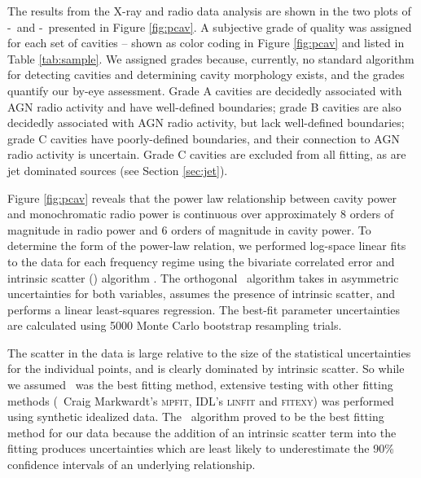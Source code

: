 \documentclass{emulateapj}
\begin{document}
The results from the X-ray and radio data analysis are shown in the
two plots of \pcav-\phigh\ and \pcav-\plow\ presented in Figure
\ref{fig:pcav}. A subjective grade of quality was assigned for each
set of cavities -- shown as color coding in Figure
\ref{fig:pcav} and listed in Table \ref{tab:sample}. We assigned
grades because, currently, no standard algorithm for detecting
cavities and determining cavity morphology exists, and the grades
quantify our by-eye assessment. Grade A cavities are decidedly
associated with AGN radio activity and have well-defined boundaries;
grade B cavities are also decidedly associated with AGN radio
activity, but lack well-defined boundaries; grade C cavities have
poorly-defined boundaries, and their connection to AGN radio activity
is uncertain. Grade C cavities are excluded from all fitting, as are
jet dominated sources (see Section \ref{sec:jet}).

Figure \ref{fig:pcav} reveals that the power law relationship between
cavity power and monochromatic radio power is continuous over
approximately 8 orders of magnitude in radio power and 6 orders of
magnitude in cavity power. To determine the form of the power-law
relation, we performed log-space linear fits to the data for each
frequency regime using the bivariate correlated error and intrinsic
scatter (\bces) algorithm \citep{bces}. The orthogonal \bces\
algorithm takes in asymmetric uncertainties for both variables,
assumes the presence of intrinsic scatter, and performs a linear
least-squares regression. The best-fit parameter uncertainties are
calculated using 5000 Monte Carlo bootstrap resampling trials.

The scatter in the data is large relative to the size of the
statistical uncertainties for the individual points, and is clearly
dominated by intrinsic scatter. So while we assumed \bces\ was the
best fitting method, extensive testing with other fitting methods
(\ie\ Craig Markwardt's {\textsc{mpfit}}, IDL's {\textsc{linfit}} and
{\textsc{fitexy}}) was performed using synthetic idealized data. The
\bces\ algorithm proved to be the best fitting method for our data
because the addition of an intrinsic scatter term into the fitting
produces uncertainties which are least likely to underestimate the
90\% confidence intervals of an underlying relationship.
\end{document}
